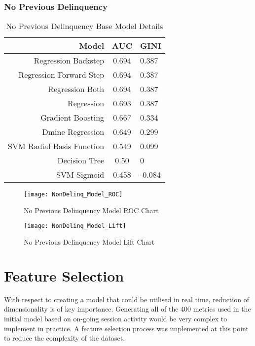 \subsubsection{No Previous Delinquency}

\begin{table}[H]
	\centering
	\begin{tabular}{r | c | l}
		\hline
		\textbf{Model} & \textbf{AUC} & \textbf{GINI} \\
		\hline
		Regression Backstep          & 0.694        & 0.387 \\
		Regression Forward Step          & 0.694        & 0.387 \\
		Regression Both          & 0.694        & 0.387 \\
		Regression          & 0.693        & 0.387 \\
		Gradient Boosting          & 0.667        & 0.334 \\
		Dmine Regression          & 0.649        & 0.299 \\
		SVM Radial Basis Function          & 0.549        & 0.099 \\
		Decision Tree          & 0.50        & 0 \\
		SVM Sigmoid         & 0.458        & -0.084 \\
		\hline
	\end{tabular}
	\caption{No Previous Delinquency Base Model Details}
\end{table}

\begin{figure}[H]
	\texttt{[image: NonDelinq\_Model\_ROC]}
	\caption{No Previous Delinquency Model ROC Chart}
	\label{fig:NonDelinq_Model_ROC}
\end{figure}

\begin{figure}[H]
	\texttt{[image: NonDelinq\_Model\_Lift]}
	\caption{No Previous Delinquency Model Lift Chart}
	\label{fig:NonDelinq_Model_Lift}
\end{figure}

\section{Feature Selection}
With respect to creating a model that could be utilised in real time, reduction of dimensionality is of key importance. Generating all of the 400 metrics used in the initial model based on on-going session activity would be very complex to implement in practice. A feature selection process was implemented at this point to reduce the complexity of the dataset. 

